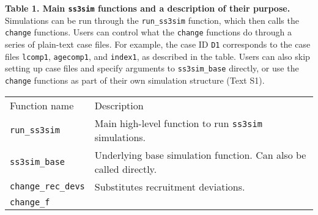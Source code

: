 \documentclass[11pt]{article}
\begin{document}
\textbf{Table 1. Main \texttt{ss3sim} functions and a description of their purpose.} Simulations can be run through the \texttt{run\_ss3sim} function, which then calls the \texttt{change} functions. Users can control what the \texttt{change} functions do through a series of plain-text case files. For example, the case ID \texttt{D1} corresponds to the case files \texttt{lcomp1}, \texttt{agecomp1}, and \texttt{index1}, as described in the table. Users can also skip setting up case files and specify arguments to \texttt{ss3sim\_base} directly, or use the \texttt{change} functions as part of their own simulation structure (Text S1).

\begin{longtable}[c]{@{}ll@{}}
\hline\noalign{\medskip}
\begin{minipage}[b]{0.32\columnwidth}\raggedright
Function name
\end{minipage} & \begin{minipage}[b]{0.57\columnwidth}\raggedright
Description
\end{minipage}
\\\noalign{\medskip}
\hline\noalign{\medskip}
\begin{minipage}[t]{0.32\columnwidth}\raggedright
\texttt{run\_ss3sim}
\end{minipage} & \begin{minipage}[t]{0.57\columnwidth}\raggedright
Main high-level function to run \texttt{ss3sim} simulations.
\end{minipage}
\\\noalign{\medskip}
\begin{minipage}[t]{0.32\columnwidth}\raggedright
\texttt{ss3sim\_base}
\end{minipage} & \begin{minipage}[t]{0.57\columnwidth}\raggedright
Underlying base simulation function. Can also be called directly.
\end{minipage}
\\\noalign{\medskip}
\begin{minipage}[t]{0.32\columnwidth}\raggedright
\texttt{change\_rec\_devs}
\end{minipage} & \begin{minipage}[t]{0.57\columnwidth}\raggedright
Substitutes recruitment deviations.
\end{minipage}
\\\noalign{\medskip}
\begin{minipage}[t]{0.32\columnwidth}\raggedright
\texttt{change\_f}
\end{minipage} & \begin{minipage}[t]{0.57\columnwidth}\raggedright

\end{minipage}
\end{longtable}
\end{document}
